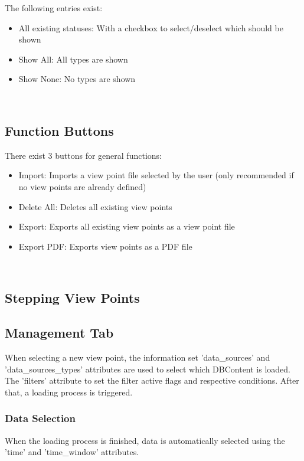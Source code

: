 The following entries exist:

\begin{itemize}  
\item All existing statuses: With a checkbox to select/deselect which should be shown
\item Show All: All types are shown
\item Show None: No types are shown
\end{itemize}
\ \\

\subsection{Function Buttons}

There exist 3 buttons for general functions:

\begin{itemize}  
\item Import: Imports a view point file selected by the user (only recommended if no view points are already defined)
\item Delete All: Deletes all existing view points
\item Export: Exports all existing view points as a view point file
\item Export PDF: Exports view points as a PDF file
\end{itemize}
\ \\

\subsection{Stepping View Points}

\subsection{Management Tab} 
When selecting a new view point, the information set 'data\_sources' and 'data\_sources\_types' attributes are used to select which DBContent is loaded. The 'filters' attribute to set the filter active flags and respective conditions. After that, a loading process is triggered. \\

\subsubsection{Data Selection}

When the loading process is finished, data is automatically selected using the 'time' and 'time\_window' attributes.


